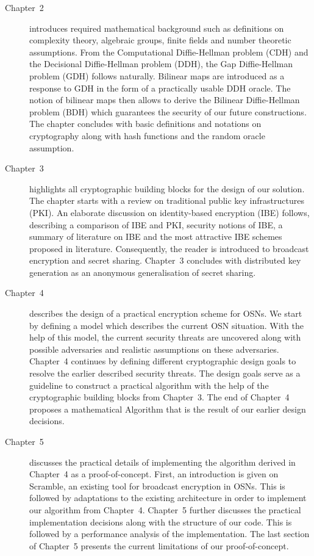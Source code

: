 \begin{description}
 \item[Chapter~2] introduces required mathematical background such as definitions on complexity theory, algebraic groups, finite fields and number theoretic assumptions. From the Computational Diffie-Hellman problem (CDH) and the Decisional Diffie-Hellman problem (DDH), the Gap Diffie-Hellman problem (GDH) follows naturally. Bilinear maps are introduced as a response to GDH in the form of a practically usable DDH oracle. The notion of bilinear maps then allows to derive the Bilinear Diffie-Hellman problem (BDH) which guarantees the security of our future constructions. The chapter concludes with basic definitions and notations on cryptography along with hash functions and the random oracle assumption.

 \item[Chapter~3] highlights all cryptographic building blocks for the design of our solution. The chapter starts with a review on traditional public key infrastructures (PKI). An elaborate discussion on identity-based encryption (IBE) follows, describing a comparison of IBE and PKI, security notions of IBE, a summary of literature on IBE and the most attractive IBE schemes proposed in literature. Consequently, the reader is introduced to broadcast encryption and secret sharing. Chapter~3 concludes with distributed key generation as an anonymous generalisation of secret sharing.

 \item[Chapter~4] describes the design of a practical encryption scheme for OSNs. We start by defining a model which describes the current OSN situation. With the help of this model, the current security threats are uncovered along with possible adversaries and realistic assumptions on these adversaries. Chapter~4 continues by defining different cryptographic design goals to resolve the earlier described security threats. The design goals serve as a guideline to construct a practical algorithm with the help of the cryptographic building blocks from Chapter~3. The end of Chapter~4 proposes a mathematical Algorithm that is the result of our earlier design decisions.

 \item[Chapter~5] discusses the practical details of implementing the algorithm derived in Chapter~4 as a proof-of-concept. First, an introduction is given on Scramble, an existing tool for broadcast encryption in OSNs. This is followed by adaptations to the existing architecture in order to implement our algorithm from Chapter~4. Chapter~5 further discusses the practical implementation decisions along with the structure of our code. This is followed by a performance analysis of the implementation. The last section of Chapter~5 presents the current limitations of our proof-of-concept.


\end{description}
